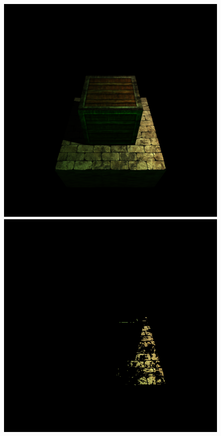 \documentclass[format=sigconf]{acmart}
\begin{document}
\begin{figure}[h]
  \begin{center}
    \begin{minipage}{.2\textwidth}
      \includegraphics[width=1.0\textwidth]{pipeline-lighting.png}
    \end{minipage}
    \begin{minipage}{.2\textwidth}
      \includegraphics[width=1.0\textwidth]{pipeline-highpass.png}

\end{minipage}
\end{center}
\end{figure}
\end{document}
